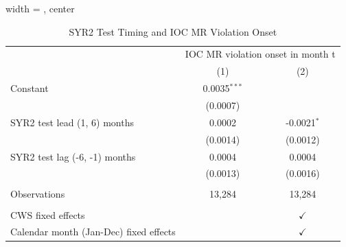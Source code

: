 
\begin{table}[htbp]
   
   \caption{\label{tab:syr2_test_mr_violation_iterative} SYR2 Test Timing and IOC MR Violation Onset}
   \bigskip
   
   \centering
   
   \begin{adjustbox}{width = \textwidth, center}
      
      
      \begin{tabular}{lcc}
         \toprule
         
          & \multicolumn{2}{c}{IOC MR violation onset in month t}\\
         
                                                & (1)            & (2)\\  
         
         \midrule 
         Constant                               & 0.0035$^{***}$ &   \\   
                                                & (0.0007)       &   \\   
         SYR2 test lead (1, 6) months           & 0.0002         & -0.0021$^{*}$\\   
                                                & (0.0014)       & (0.0012)\\   
         SYR2 test lag (-6, -1) months          & 0.0004         & 0.0004\\   
                                                & (0.0013)       & (0.0016)\\   
         
          \\
         
         Observations                           & 13,284         & 13,284\\  
         
          \\
         
         CWS fixed effects                      &                & $\checkmark$\\   
         Calendar month (Jan-Dec) fixed effects &                & $\checkmark$\\   
         
         \bottomrule
         
      \end{tabular}
      

\end{adjustbox}
\end{table}
